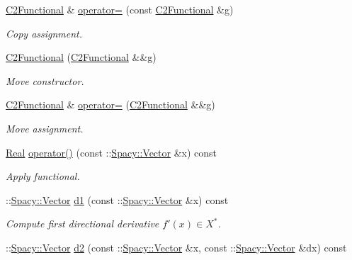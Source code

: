 \begin{DoxyCompactItemize}
\item 
\hyperlink{classSpacy_1_1FEniCS_1_1C2Functional}{\-C2\-Functional} \& \hyperlink{classSpacy_1_1FEniCS_1_1C2Functional_ab9ff23de1e812f6782b7db6ec01e0f4c}{operator=} (const \hyperlink{classSpacy_1_1FEniCS_1_1C2Functional}{\-C2\-Functional} \&g)
\begin{DoxyCompactList}\small\item\em \-Copy assignment. \end{DoxyCompactList}\item 
\hyperlink{classSpacy_1_1FEniCS_1_1C2Functional_af9ac63335fc062d18e08fa186312b5a2}{\-C2\-Functional} (\hyperlink{classSpacy_1_1FEniCS_1_1C2Functional}{\-C2\-Functional} \&\&g)
\begin{DoxyCompactList}\small\item\em \-Move constructor. \end{DoxyCompactList}\item 
\hyperlink{classSpacy_1_1FEniCS_1_1C2Functional}{\-C2\-Functional} \& \hyperlink{classSpacy_1_1FEniCS_1_1C2Functional_a96a909732f7f098d67ee5eba20406337}{operator=} (\hyperlink{classSpacy_1_1FEniCS_1_1C2Functional}{\-C2\-Functional} \&\&g)
\begin{DoxyCompactList}\small\item\em \-Move assignment. \end{DoxyCompactList}\item 
\hyperlink{classSpacy_1_1Real}{\-Real} \hyperlink{classSpacy_1_1FEniCS_1_1C2Functional_abbf25dfc8e8c40edd3ac2dfb61030599}{operator()} (const \-::\hyperlink{classSpacy_1_1Vector}{\-Spacy\-::\-Vector} \&x) const 
\begin{DoxyCompactList}\small\item\em \-Apply functional. \end{DoxyCompactList}\item 
\-::\hyperlink{classSpacy_1_1Vector}{\-Spacy\-::\-Vector} \hyperlink{classSpacy_1_1FEniCS_1_1C2Functional_ab9b10dc982f81093c3125027b46c5876}{d1} (const \-::\hyperlink{classSpacy_1_1Vector}{\-Spacy\-::\-Vector} \&x) const 
\begin{DoxyCompactList}\small\item\em \-Compute first directional derivative $f'(x) \in X^* $. \end{DoxyCompactList}\item 
\-::\hyperlink{classSpacy_1_1Vector}{\-Spacy\-::\-Vector} \hyperlink{classSpacy_1_1FEniCS_1_1C2Functional_affc6728db99f20f57ce75f16799084b4}{d2} (const \-::\hyperlink{classSpacy_1_1Vector}{\-Spacy\-::\-Vector} \&x, const \-::\hyperlink{classSpacy_1_1Vector}{\-Spacy\-::\-Vector} \&dx) const 

\end{DoxyCompactItemize}
